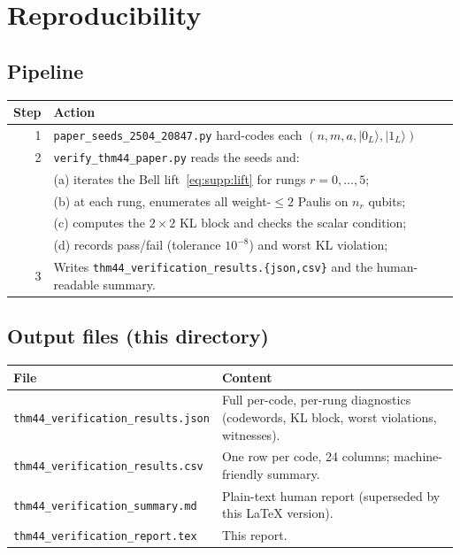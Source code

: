 \documentclass[11pt]{article}
\begin{document}
\section{Reproducibility}
\label{sec:repro}

\subsection{Pipeline}

\begin{center}
\begin{tabular}{@{}rl@{}}
\toprule
Step & Action \\
\midrule
1 & \texttt{paper\_seeds\_2504\_20847.py} hard-codes each $(n,m,a,|0_L\rangle,|1_L\rangle)$\\
2 & \texttt{verify\_thm44\_paper.py} reads the seeds and:\\
  & \quad (a) iterates the Bell lift~\eqref{eq:supp:lift} for rungs $r=0,\ldots,5$;\\
  & \quad (b) at each rung, enumerates all weight-$\le 2$ Paulis on $n_r$ qubits;\\
  & \quad (c) computes the $2\times 2$ KL block and checks the scalar condition;\\
  & \quad (d) records pass/fail (tolerance $10^{-8}$) and worst KL violation;\\
3 & Writes \texttt{thm44\_verification\_results.\{json,csv\}} and the
       human-readable summary.\\
\bottomrule
\end{tabular}
\end{center}

\subsection{Output files (this directory)}

\begin{center}
\begin{tabular}{@{}lL{9cm}@{}}
\toprule
File & Content \\
\midrule
\texttt{thm44\_verification\_results.json} & Full per-code, per-rung
diagnostics (codewords, KL block, worst violations, witnesses).\\
\texttt{thm44\_verification\_results.csv}  & One row per code, 24 columns;
machine-friendly summary.\\
\texttt{thm44\_verification\_summary.md}   & Plain-text human report
(superseded by this LaTeX version).\\
\texttt{thm44\_verification\_report.tex}   & This report.\\
\bottomrule
\end{tabular}
\end{center}
\end{document}
